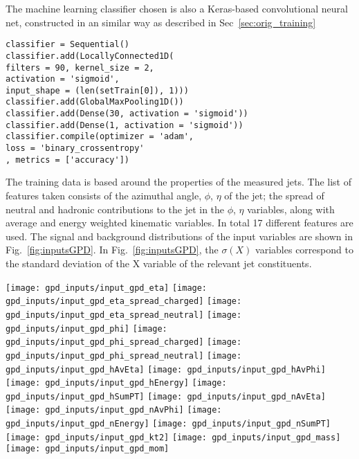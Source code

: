 The machine learning classifier chosen is also a Keras-based convolutional neural net,
constructed in an similar way as described in Sec~\ref{sec:orig_training}
\begin{lstlisting}
classifier = Sequential()
classifier.add(LocallyConnected1D(
filters = 90, kernel_size = 2,
activation = 'sigmoid',
input_shape = (len(setTrain[0]), 1)))
classifier.add(GlobalMaxPooling1D())
classifier.add(Dense(30, activation = 'sigmoid'))
classifier.add(Dense(1, activation = 'sigmoid'))
classifier.compile(optimizer = 'adam',
loss = 'binary_crossentropy'
, metrics = ['accuracy'])
\end{lstlisting}

The training data is based around the properties of the measured jets. The list of features
taken consists of the azimuthal angle, $\phi$, $\eta$ of the jet; the spread of neutral and 
hadronic contributions to the jet in the $\phi$, $\eta$ variables, along with average and energy weighted
kinematic variables. In total 17 different features are used.
The signal and background distributions of the input variables
are shown in Fig.~\ref{fig:inputsGPD}. In Fig.~\ref{fig:inputsGPD},
the $\sigma(X)$ variables correspond to the standard deviation of the X 
variable of the relevant jet constituents.
%
\begin{figure*}[t]
\centering
\texttt{[image: gpd\_inputs/input\_gpd\_eta]}
\texttt{[image: gpd\_inputs/input\_gpd\_eta\_spread\_charged]}
\texttt{[image: gpd\_inputs/input\_gpd\_eta\_spread\_neutral]}
\texttt{[image: gpd\_inputs/input\_gpd\_phi]}
\texttt{[image: gpd\_inputs/input\_gpd\_phi\_spread\_charged]}
\texttt{[image: gpd\_inputs/input\_gpd\_phi\_spread\_neutral]}
\texttt{[image: gpd\_inputs/input\_gpd\_hAvEta]}
\texttt{[image: gpd\_inputs/input\_gpd\_hAvPhi]}
\texttt{[image: gpd\_inputs/input\_gpd\_hEnergy]}
\texttt{[image: gpd\_inputs/input\_gpd\_hSumPT]}
\texttt{[image: gpd\_inputs/input\_gpd\_nAvEta]}
\texttt{[image: gpd\_inputs/input\_gpd\_nAvPhi]}
\texttt{[image: gpd\_inputs/input\_gpd\_nEnergy]}
\texttt{[image: gpd\_inputs/input\_gpd\_nSumPT]}
\texttt{[image: gpd\_inputs/input\_gpd\_kt2]}
\texttt{[image: gpd\_inputs/input\_gpd\_mass]}
\texttt{[image: gpd\_inputs/input\_gpd\_mom]}
\caption{\small Comparison of the signal and background distributions
used to train the Keras jet separation classifier.}
\label{fig:inputsGPD}
\end{figure*}

